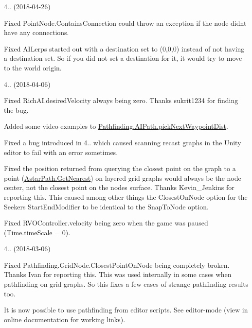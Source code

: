 \begin{DoxyItemize}
\begin{DoxyItemize}
\begin{DoxyItemize}
\end{DoxyItemize}
\end{DoxyItemize}
\item 4.. (2018-\/04-\/26)
\begin{DoxyItemize}
\item Fixed Point\+Node.\+Contains\+Connection could throw an exception if the node didn\textquotesingle{}t have any connections.
\item Fixed A\+I\+Lerp\textquotesingle{}s started out with a destination set to (0,0,0) instead of not having a destination set. So if you did not set a destination for it, it would try to move to the world origin.
\end{DoxyItemize}
\item 4.. (2018-\/04-\/06)
\begin{DoxyItemize}
\item Fixed Rich\+A\+I.\+desired\+Velocity always being zero. Thanks sukrit1234 for finding the bug.
\item Added some video examples to \mbox{\hyperlink{class_pathfinding_1_1_a_i_path_adabb6114c1087142079534f593bfae82}{Pathfinding.\+A\+I\+Path.\+pick\+Next\+Waypoint\+Dist}}.
\item Fixed a bug introduced in 4.. which caused scanning recast graphs in the Unity editor to fail with an error sometimes.
\item Fixed the position returned from querying the closest point on the graph to a point (\mbox{\hyperlink{class_astar_path_a7d49736e7a25f4cf9fc24bdbec862359}{Astar\+Path.\+Get\+Nearest}}) on layered grid graphs would always be the node center, not the closest point on the node\textquotesingle{}s surface. Thanks Kevin\+\_\+\+Jenkins for reporting this. This caused among other things the Closest\+On\+Node option for the Seeker\textquotesingle{}s Start\+End\+Modifier to be identical to the Snap\+To\+Node option.
\item Fixed R\+V\+O\+Controller.\+velocity being zero when the game was paused (Time.\+time\+Scale = 0).
\end{DoxyItemize}
\item 4.. (2018-\/03-\/06)
\begin{DoxyItemize}
\item Fixed Pathfinding.\+Grid\+Node.\+Closest\+Point\+On\+Node being completely broken. Thanks Ivan for reporting this. This was used internally in some cases when pathfinding on grid graphs. So this fixes a few cases of strange pathfinding results too.
\item It is now possible to use pathfinding from editor scripts. See editor-\/mode (view in online documentation for working links).

\end{DoxyItemize}
\end{DoxyItemize}
